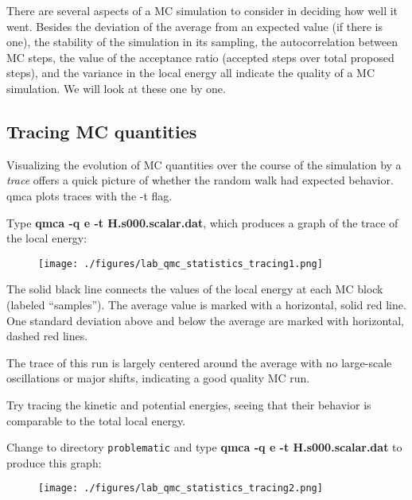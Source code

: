There are several aspects of a MC simulation to consider in deciding how well
it went.  Besides the deviation of the average from an expected value (if there
is one), the stability of the simulation in its sampling, the autocorrelation
between MC steps, the value of the acceptance ratio (accepted steps over total
proposed steps), and the variance in the local energy all indicate the quality
of a MC simulation.  We will look at these one by one.

\subsection{Tracing MC quantities}

Visualizing the evolution of MC quantities over the course of the simulation by
a \textit{trace} offers a quick picture of whether the random walk had expected
behavior.  qmca plots traces with the -t flag.

Type \textbf{qmca -q e -t H.s000.scalar.dat}, which produces a graph of the
trace of the local energy:

\FloatBarrier
\begin{figure}[ht!]
\begin{center}
\texttt{[image: ./figures/lab\_qmc\_statistics\_tracing1.png]}
\end{center}
\end{figure}
\FloatBarrier


The solid black line connects the values of the local energy at each MC block
(labeled ``samples'').  The average value is marked with a horizontal, solid
red line.  One standard deviation above and below the average are marked with
horizontal, dashed red lines.  

The trace of this run is largely centered around the average with no
large-scale oscillations or major shifts, indicating a good quality MC run. 

Try tracing the kinetic and potential energies, seeing that their behavior is
comparable to the total local energy.

Change to directory \texttt{problematic} and type \textbf{qmca -q e -t
H.s000.scalar.dat} to produce this graph:

\FloatBarrier
\begin{figure}[ht!]
\begin{center}
\texttt{[image: ./figures/lab\_qmc\_statistics\_tracing2.png]}
\end{center}
\end{figure}
\FloatBarrier

